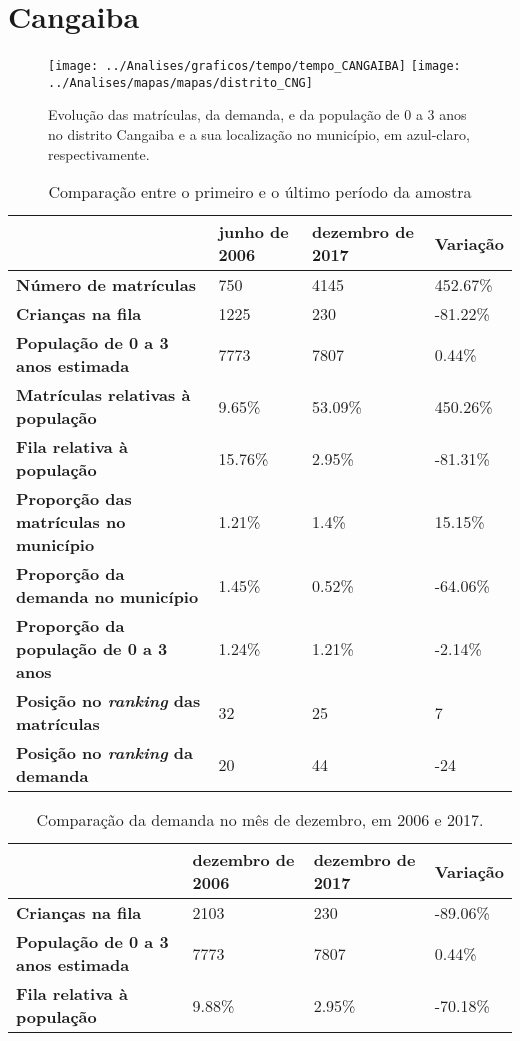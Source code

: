 \section{Cangaiba}
\begin{figure}[H]
\centering
\texttt{[image: ../Analises/graficos/tempo/tempo\_CANGAIBA]}
\texttt{[image: ../Analises/mapas/mapas/distrito\_CNG]}
\caption{Evolução das matrículas, da demanda, e da população de 0 a 3 anos no distrito Cangaiba e a sua localização no município, em azul-claro, respectivamente.}
\end{figure}
\begin{table}[H]
\begin{tabular}{l|l|l|l}
\textbf{}                                      & \textbf{junho de 2006}       & \textbf{dezembro de 2017}    & \textbf{Variação} \\ \hline
\textbf{Número de matrículas}                  & 750 & 4145 & 452.67\% \\ \hline
\textbf{Crianças na fila}                      & 1225 & 230 & -81.22\% \\ \hline
\textbf{População de 0 a 3 anos estimada}      & 7773 & 7807 & 0.44\% \\ \hline
\textbf{Matrículas relativas à população}      & 9.65\% & 53.09\% & 450.26\% \\ \hline
\textbf{Fila relativa à população}             & 15.76\% & 2.95\% & -81.31\% \\ \hline
\textbf{Proporção das matrículas no município} & 1.21\% & 1.4\% & 15.15\% \\ \hline
\textbf{Proporção da demanda no município}     & 1.45\% & 0.52\% & -64.06\% \\ \hline
\textbf{Proporção da população de 0 a 3 anos}  & 1.24\% & 1.21\% & -2.14\% \\ \hline
\textbf{Posição no \textit{ranking} das matrículas}     & 32 & 25 & 7 \\ \hline
\textbf{Posição no \textit{ranking} da demanda}         & 20 & 44 & -24 \\ 
\end{tabular}
\caption{Comparação entre o primeiro e o último período da amostra}
\end{table}
\begin{table}[H]
\begin{tabular}{l|l|l|l}
\textbf{}                                 & \textbf{dezembro de 2006} & \textbf{dezembro de 2017} & \textbf{Variação} \\ \hline
\textbf{Crianças na fila}                      & 2103 & 230 & -89.06\% \\ \hline
\textbf{População de 0 a 3 anos estimada}      & 7773 & 7807 & 0.44\% \\ \hline
\textbf{Fila relativa à população}             & 9.88\% & 2.95\% & -70.18\% \\
\end{tabular}
\caption{Comparação da demanda no mês de dezembro, em 2006 e 2017.}
\end{table}
